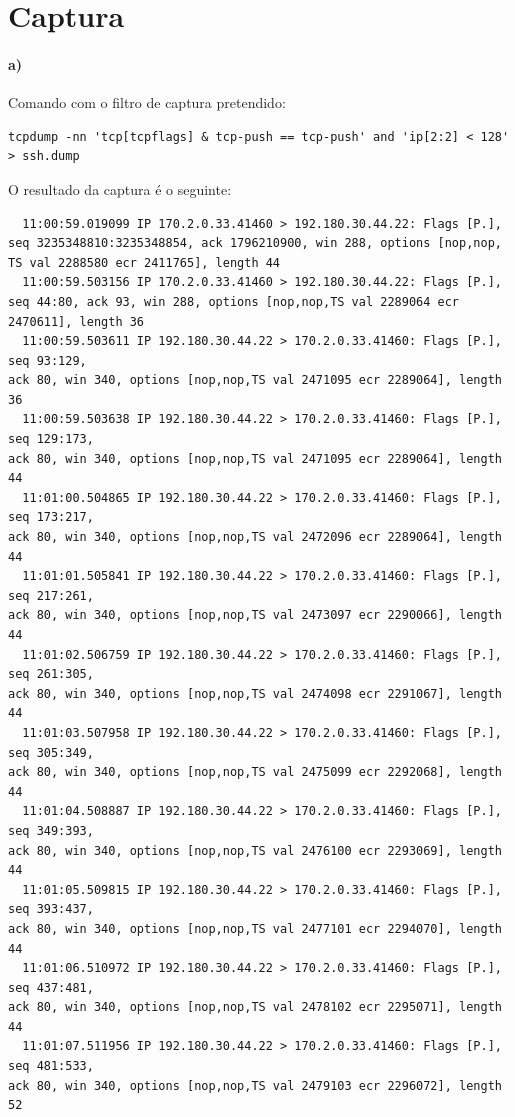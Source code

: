 \section{Captura}
\paragraph{a)}
Comando com o filtro de captura pretendido:
\begin{verbatim}
tcpdump -nn 'tcp[tcpflags] & tcp-push == tcp-push' and 'ip[2:2] < 128' > ssh.dump
\end{verbatim}

O resultado da captura é o seguinte:
\begin{verbatim}
  11:00:59.019099 IP 170.2.0.33.41460 > 192.180.30.44.22: Flags [P.],
seq 3235348810:3235348854, ack 1796210900, win 288, options [nop,nop,
TS val 2288580 ecr 2411765], length 44
  11:00:59.503156 IP 170.2.0.33.41460 > 192.180.30.44.22: Flags [P.], 
seq 44:80, ack 93, win 288, options [nop,nop,TS val 2289064 ecr 2470611], length 36
  11:00:59.503611 IP 192.180.30.44.22 > 170.2.0.33.41460: Flags [P.], seq 93:129, 
ack 80, win 340, options [nop,nop,TS val 2471095 ecr 2289064], length 36
  11:00:59.503638 IP 192.180.30.44.22 > 170.2.0.33.41460: Flags [P.], seq 129:173, 
ack 80, win 340, options [nop,nop,TS val 2471095 ecr 2289064], length 44
  11:01:00.504865 IP 192.180.30.44.22 > 170.2.0.33.41460: Flags [P.], seq 173:217, 
ack 80, win 340, options [nop,nop,TS val 2472096 ecr 2289064], length 44
  11:01:01.505841 IP 192.180.30.44.22 > 170.2.0.33.41460: Flags [P.], seq 217:261, 
ack 80, win 340, options [nop,nop,TS val 2473097 ecr 2290066], length 44
  11:01:02.506759 IP 192.180.30.44.22 > 170.2.0.33.41460: Flags [P.], seq 261:305, 
ack 80, win 340, options [nop,nop,TS val 2474098 ecr 2291067], length 44
  11:01:03.507958 IP 192.180.30.44.22 > 170.2.0.33.41460: Flags [P.], seq 305:349, 
ack 80, win 340, options [nop,nop,TS val 2475099 ecr 2292068], length 44
  11:01:04.508887 IP 192.180.30.44.22 > 170.2.0.33.41460: Flags [P.], seq 349:393, 
ack 80, win 340, options [nop,nop,TS val 2476100 ecr 2293069], length 44
  11:01:05.509815 IP 192.180.30.44.22 > 170.2.0.33.41460: Flags [P.], seq 393:437, 
ack 80, win 340, options [nop,nop,TS val 2477101 ecr 2294070], length 44
  11:01:06.510972 IP 192.180.30.44.22 > 170.2.0.33.41460: Flags [P.], seq 437:481, 
ack 80, win 340, options [nop,nop,TS val 2478102 ecr 2295071], length 44
  11:01:07.511956 IP 192.180.30.44.22 > 170.2.0.33.41460: Flags [P.], seq 481:533, 
ack 80, win 340, options [nop,nop,TS val 2479103 ecr 2296072], length 52

\end{verbatim}
